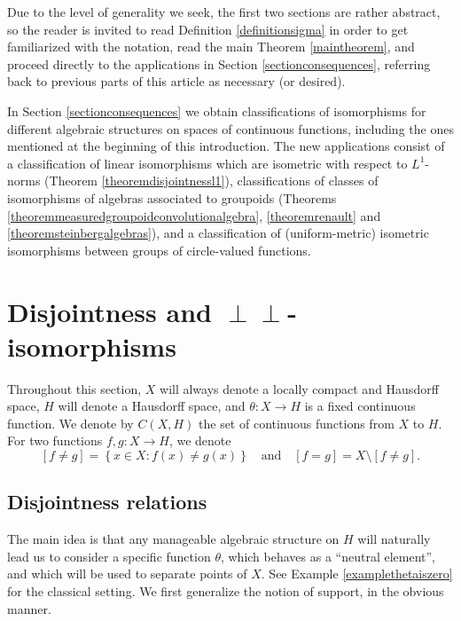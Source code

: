 \documentclass[letter,11pt]{amsart}
\theoremstyle{plain}		\newtheorem{theorem}[generalnumbering]{Theorem}
\theoremstyle{plain}		\newtheorem{corollary}[generalnumbering]{Corollary}
\theoremstyle{definition}		\newtheorem{definition}[generalnumbering]{Definition}
\theoremstyle{definition}		\newtheorem{example}[generalnumbering]{Example}
\theoremstyle{plain}		\newtheorem{proposition}[generalnumbering]{Proposition}
\theoremstyle{plain}		\newtheorem{lemma}[generalnumbering]{Lemma}
\theoremstyle{plain}    \newtheorem{plainstyle}[generalnumbering]{\namefordifferentenvironment}
\theoremstyle{plain}    \newtheorem*{plainstyle*}{\namefordifferentenvironment}
\theoremstyle{definition}    \newtheorem{definitionstyle}[generalnumbering]{\namefordifferentenvironment}
\theoremstyle{definition}    \newtheorem*{definitionstyle*}{\namefordifferentenvironment}
\newcommand{\perpp}{\perp\!\!\!\perp}
\begin{document}
Due to the level of generality we seek, the first two sections are rather abstract, so the reader is invited to read Definition \ref{definitionsigma} in order to get familiarized with the notation, read the main Theorem \ref{maintheorem}, and proceed directly to the applications in Section \ref{sectionconsequences}, referring back to previous parts of this article as necessary (or desired).

In Section \ref{sectionconsequences} we obtain classifications of isomorphisms for different algebraic structures on spaces of continuous functions, including the ones mentioned at the beginning of this introduction. The new applications consist of a classification of linear isomorphisms which are isometric with respect to $L^1$-norms (Theorem \ref{theoremdisjointnessl1}), classifications of classes of isomorphisms of algebras associated to groupoids (Theorems \ref{theoremmeasuredgroupoidconvolutionalgebra}, \ref{theoremrenault} and \ref{theoremsteinbergalgebras}), and a classification of (uniform-metric) isometric isomorphisms between groups of circle-valued functions.

\section{Disjointness and \texorpdfstring{$\perpp$}{⊥⊥}-isomorphisms}\label{sectiondisjointness}

Throughout this section, $X$ will always denote a locally compact and Hausdorff space, $H$ will denote a Hausdorff space, and $\theta\colon X\to H$ is a fixed continuous function. We denote by $C(X,H)$ the set of continuous functions from $X$ to $H$. For two functions $f,g\colon X\to H$, we denote
\[[f\neq g]=\left\{x\in X:f(x)\neq g(x)\right\}\quad\text{and}\quad[f=g]=X\setminus[f\neq g].\]

\subsection{Disjointness relations}

The main idea is that any manageable algebraic structure on $H$ will naturally lead us to consider a specific function $\theta$, which behaves as a ``neutral element'', and which will be used to separate points of $X$. See Example \ref{examplethetaiszero} for the classical setting. We first generalize the notion of support, in the obvious manner.
\end{document}
